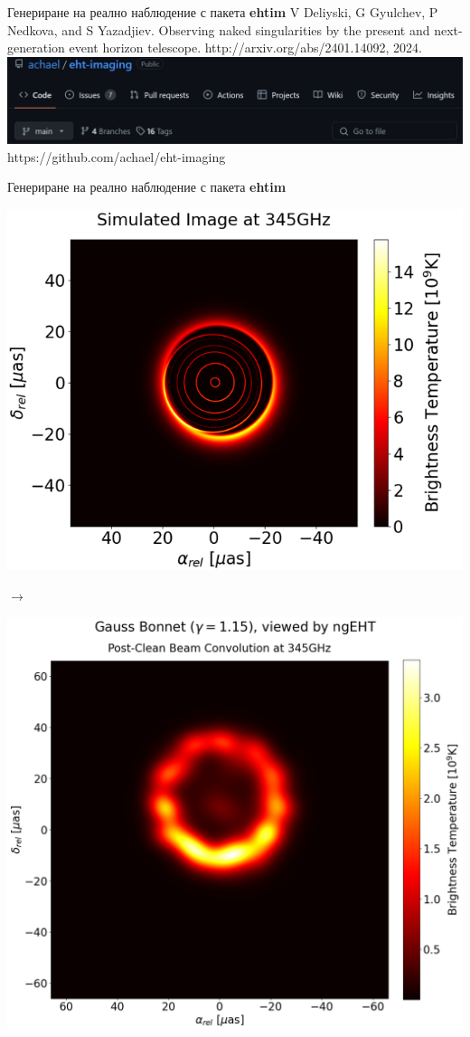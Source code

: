 \documentclass[hyperref={colorlinks,citecolor=blue,linkcolor=blue,urlcolor=blue}]{beamer}
\begin{document}
\begin{frame}{Генериране на реално наблюдение с пакета \textbf{ehtim}}
		\tiny V Deliyski, G Gyulchev, P Nedkova, and S Yazadjiev.
		Observing naked singularities by the present and next-generation event horizon
		telescope. http://arxiv.org/abs/2401.14092, 2024.
		\centering
		\includegraphics[scale = 0.5]{Pre-Defence/ehtim_github.png}
		\small https://github.com/achael/eht-imaging
	\end{frame}
	
	\begin{frame}{Генериране на реално наблюдение с пакета \textbf{ehtim}}
		\centering
		\begin{minipage}{13em}
			\includegraphics[scale = 0.50]{Pre-Defence/GB_ray_tracer_345.png}
		\end{minipage}\qquad$\rightarrow$
		\begin{minipage}{13em}
			\includegraphics[scale = 0.14]{Pre-Defence/Ehtim_plot_ngEHT_345.png}

\end{minipage}
\end{frame}
\end{document}
